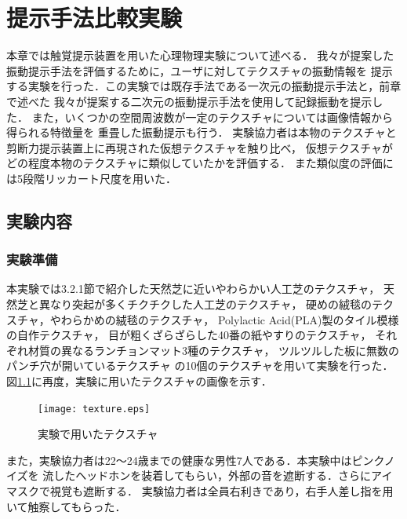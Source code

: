 
\chapter{提示手法比較実験}
本章では触覚提示装置を用いた心理物理実験について述べる．
我々が提案した振動提示手法を評価するために，ユーザに対してテクスチャの振動情報を
提示する実験を行った．この実験では既存手法である一次元の振動提示手法と，前章で述べた
我々が提案する二次元の振動提示手法を使用して記録振動を提示した．
また，いくつかの空間周波数が一定のテクスチャについては画像情報から得られる特徴量を
重畳した振動提示も行う．
実験協力者は本物のテクスチャと剪断力提示装置上に再現された仮想テクスチャを触り比べ，
仮想テクスチャがどの程度本物のテクスチャに類似していたかを評価する．
また類似度の評価には5段階リッカート尺度を用いた．



\section{実験内容}
\subsection{実験準備}
本実験では3.2.1節で紹介した天然芝に近いやわらかい人工芝のテクスチャ，
天然芝と異なり突起が多くチクチクした人工芝のテクスチャ，
硬めの絨毯のテクスチャ，やわらかめの絨毯のテクスチャ，
Polylactic Acid(PLA)製のタイル模様の自作テクスチャ，
目が粗くざらざらした40番の紙やすりのテクスチャ，
それぞれ材質の異なるランチョンマット3種のテクスチャ，
ツルツルした板に無数のパンチ穴が開いているテクスチャ
の10個のテクスチャを用いて実験を行った．
図\ref{5-1}に再度，実験に用いたテクスチャの画像を示す．

\begin{figure}[h]
\begin{center}
  \texttt{[image: texture.eps]}
  \caption{実験で用いたテクスチャ}
  \label{5-1}
\end{center}
\end{figure}

また，実験協力者は22〜24歳までの健康な男性7人である．本実験中はピンクノイズを
流したヘッドホンを装着してもらい，外部の音を遮断する．さらにアイマスクで視覚も遮断する．
実験協力者は全員右利きであり，右手人差し指を用いて触察してもらった．


